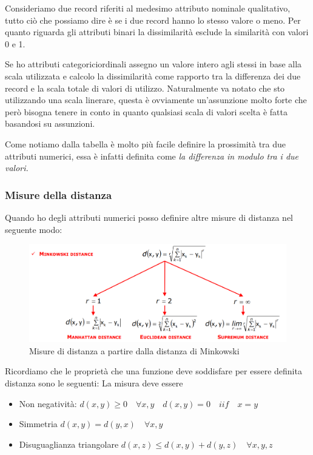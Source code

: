 Consideriamo due record riferiti al medesimo attributo nominale qualitativo, tutto ciò che possiamo dire è se i due record hanno  lo stesso valore o meno.
Per quanto riguarda gli attributi binari la dissimilarità esclude la similarità con valori 0 e 1. 

Se ho attributi categoriciordinali assegno un valore intero agli stessi in base alla scala utilizzata e calcolo la dissimilarità come rapporto tra la differenza dei due record e la scala totale di valori di utilizzo. Naturalmente va notato che sto utilizzando una scala linerare, questa è ovviamente un'assunzione molto forte che però bisogna tenere in conto in quanto qualsiasi scala di valori scelta è fatta basandosi su assunzioni.

Come notiamo dalla tabella è molto più facile definire la prossimità tra due attributi numerici, essa è infatti definita come \textit{la differenza in modulo tra i due valori.}
\subsubsection{Misure della distanza}

Quando ho degli attributi numerici posso definire altre misure di distanza nel seguente modo:
\begin{figure}[H]
	\centering
	\includegraphics[height=0.3 \linewidth]{clustering/pict/distanze_minkowski.png}
	\caption{Misure di distanza a partire dalla distanza di Minkowski}
\end{figure}
Ricordiamo che le proprietà che una funzione deve soddisfare per essere definita distanza sono le seguenti:
La misura deve essere
\begin{itemize}
	\item Non negatività: $d(x,y) \geq 0 \quad \forall x,y \quad d(x,y) = 0 \quad iif \quad x = y$
	\item Simmetria $d(x,y) = d(y,x) \quad \forall x,y$
	\item Disuguaglianza triangolare $d(x,z) \leq d(x,y) + d(y,z) \quad \forall x,y,z$
\end{itemize}

